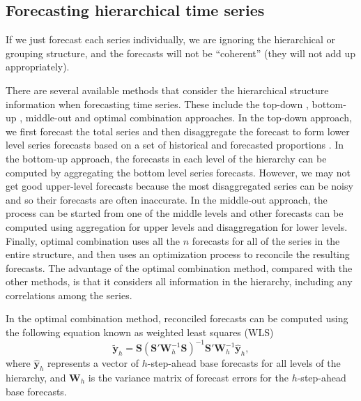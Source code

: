 \documentclass[11pt,a4paper,]{article}
\begin{document}
\hypertarget{forecasting-hierarchical-time-series}{%
\subsection{Forecasting hierarchical time
series}\label{forecasting-hierarchical-time-series}}

If we just forecast each series individually, we are ignoring the
hierarchical or grouping structure, and the forecasts will not be
``coherent'' (they will not add up appropriately).

There are several available methods that consider the hierarchical
structure information when forecasting time series. These include the
top-down \autocite{gross1990disaggregation,fliedner2001hierarchical},
bottom-up \autocite{kahn1998revisiting}, middle-out and optimal
combination \autocite{hyndman2011optimal} approaches. In the top-down
approach, we first forecast the total series and then disaggregate the
forecast to form lower level series forecasts based on a set of
historical and forecasted proportions \autocite[for details
see][]{athanasopoulos2009hierarchical}. In the bottom-up approach, the
forecasts in each level of the hierarchy can be computed by aggregating
the bottom level series forecasts. However, we may not get good
upper-level forecasts because the most disaggregated series can be noisy
and so their forecasts are often inaccurate. In the middle-out approach,
the process can be started from one of the middle levels and other
forecasts can be computed using aggregation for upper levels and
disaggregation for lower levels. Finally, optimal combination uses all
the \(n\) forecasts for all of the series in the entire structure, and
then uses an optimization process to reconcile the resulting forecasts.
The advantage of the optimal combination method, compared with the other
methods, is that it considers all information in the hierarchy,
including any correlations among the series.

In the optimal combination method, reconciled forecasts can be computed
using the following equation known as weighted least squares (WLS)
\autocite{mint2018} \begin{equation}\label{eq:mint}
  \tilde{\bm{y}}_{h}=\bm{S}(\bm{S}'\bm{W}_h^{-1}\bm{S})^{-1}\bm{S}'\bm{W}_h^{-1}\hat{\bm{y}}_h,
\end{equation} where \(\hat{\bm{y}}_h\) represents a vector of
\(h\)-step-ahead base forecasts for all levels of the hierarchy, and
\(\bm{W}_h\) is the variance matrix of forecast errors for the
\(h\)-step-ahead base forecasts.
\end{document}

